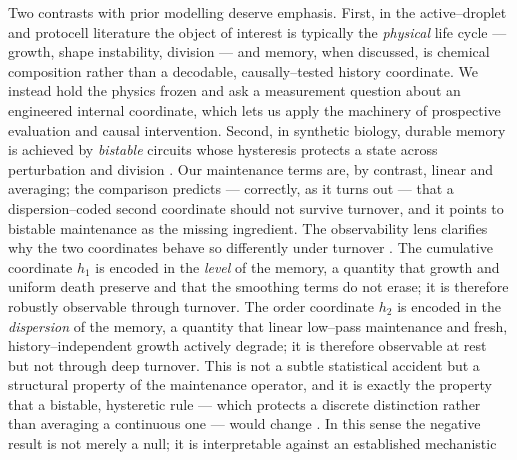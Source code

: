 \documentclass[11pt]{article}
\begin{document}
Two contrasts with prior modelling deserve emphasis. First, in the active--droplet and protocell literature the
object of interest is typically the \emph{physical} life cycle --- growth, shape instability, division
\citep{zwicker2017,hanczyc2003} --- and memory, when discussed, is chemical composition rather than a decodable,
causally--tested history coordinate. We instead hold the physics frozen and ask a measurement question about an
engineered internal coordinate, which lets us apply the machinery of prospective evaluation and causal intervention.
Second, in synthetic biology, durable memory is achieved by \emph{bistable} circuits whose hysteresis protects a
state across perturbation and division \citep{gardner2000,elowitz2000,ferrell2002}. Our maintenance terms are, by
contrast, linear and averaging; the comparison predicts --- correctly, as it turns out --- that a dispersion--coded
second coordinate should not survive turnover, and it points to bistable maintenance as the missing ingredient. The observability lens clarifies why the two coordinates behave so differently under turnover \citep{hermann1977}. The cumulative coordinate $h_1$ is encoded in the \emph{level} of the memory, a quantity that growth and uniform death preserve and that the smoothing terms do not erase; it is therefore robustly observable through turnover. The order coordinate $h_2$ is encoded in the \emph{dispersion} of the memory, a quantity that linear low--pass maintenance and fresh, history--independent growth actively degrade; it is therefore observable at rest but not through deep turnover. This is not a subtle statistical accident but a structural property of the maintenance operator, and it is exactly the property that a bistable, hysteretic rule --- which protects a discrete distinction rather than averaging a continuous one --- would change \citep{gardner2000,ferrell2002,ptashne2004}. In
this sense the negative result is not merely a null; it is interpretable against an established mechanistic
\end{document}

